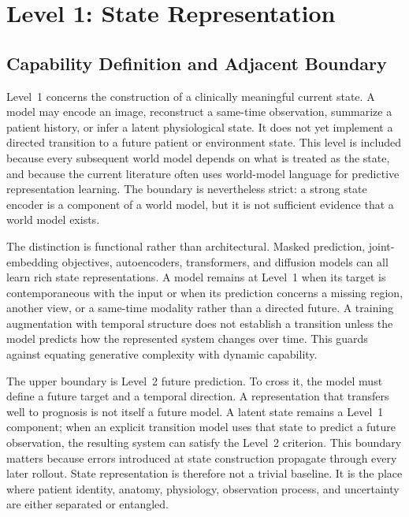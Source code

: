 \section{Level 1: State Representation}
\label{sec:level1}

\subsection{Capability Definition and Adjacent Boundary}

Level~1 concerns the construction of a clinically meaningful current state. A model may encode an image, reconstruct a same-time observation, summarize a patient history, or infer a latent physiological state. It does not yet implement a directed transition to a future patient or environment state. This level is included because every subsequent world model depends on what is treated as the state, and because the current literature often uses world-model language for predictive representation learning. The boundary is nevertheless strict: a strong state encoder is a component of a world model, but it is not sufficient evidence that a world model exists.

The distinction is functional rather than architectural. Masked prediction, joint-embedding objectives, autoencoders, transformers, and diffusion models can all learn rich state representations. A model remains at Level~1 when its target is contemporaneous with the input or when its prediction concerns a missing region, another view, or a same-time modality rather than a directed future. A training augmentation with temporal structure does not establish a transition unless the model predicts how the represented system changes over time. This guards against equating generative complexity with dynamic capability.

The upper boundary is Level~2 future prediction. To cross it, the model must define a future target and a temporal direction. A representation that transfers well to prognosis is not itself a future model. A latent state remains a Level~1 component; when an explicit transition model uses that state to predict a future observation, the resulting system can satisfy the Level~2 criterion. This boundary matters because errors introduced at state construction propagate through every later rollout. State representation is therefore not a trivial baseline. It is the place where patient identity, anatomy, physiology, observation process, and uncertainty are either separated or entangled.

